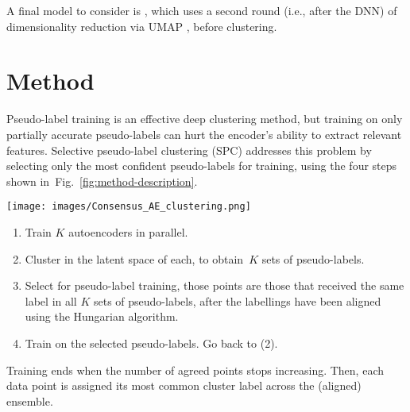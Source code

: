 \documentclass[runningheads]{llncs}
\begin{document}
A final model to consider is \cite{mcconville2019n2d}, which uses a second round (i.e., after the DNN) of dimensionality reduction via UMAP \cite{mcinnes2018umap}, before clustering.



 \section{Method} \label{sec:method}
 Pseudo-label training is an effective deep clustering method, but training on only partially accurate pseudo-labels can hurt the encoder's ability to extract relevant features. Selective pseudo-label clustering (SPC) addresses this problem by selecting only the most confident pseudo-labels for training, using the four steps shown in~Fig.~\ref{fig:method-description}. 

\begin{figure*}[t]
    \centering
    \texttt{[image: images/Consensus\_AE\_clustering.png]}
    \caption{ \small The complete SPC method. (1) Pretrain autoencoders. (2)~Perform multiple clusterings independently. (3) Identify agreed points as those that receive the same label in all ensemble members. (4) Perform pseudo-label training on agreed points and autoencoder training on unagreed points. Steps (2)--(4) are looped until the number of agreed points stops increasing.}
    \label{fig:method-description}
    \vspace{-3ex}
\end{figure*}


\begin{enumerate}
\item Train $K$ autoencoders in parallel.
    \item Cluster in the latent space of each, to obtain~$K$ sets of pseudo-labels.
    \item Select for pseudo-label training, those points are those that received the same label in all $K$ sets of pseudo-labels, after the labellings have been aligned using the Hungarian algorithm.
    \item Train on the selected pseudo-labels. Go back to (2).
\end{enumerate} 
Training ends when the number of agreed points stops increasing. Then, each data point is assigned  its most common cluster label across the (aligned) ensemble. 
\end{document}

